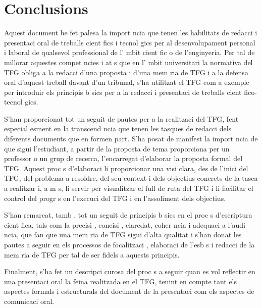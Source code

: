 
\chapter{Conclusions}

Aquest document he fet palesa la import ncia que tenen les habilitats de redacci  i presentaci  oral de treballs cient fics i tecnol gics per al desenvolupament personal i laboral de qualsevol professional de l' mbit cient fic o de l'enginyeria. Per tal de millorar aquestes compet ncies i at s que en l' mbit universitari la normativa del \ac{TFG} obliga a la redacci  d'una proposta i d'una mem ria de \ac{TFG} i a la defensa oral d'aquest treball davant d'un tribunal, s'ha utilitzat el \ac{TFG} com a exemple per introduir els principis b sics per a la redacci  i presentaci  de treballs cient fico-tecnol gics.

S'han proporcionat tot un seguit de pautes per a la realitzaci  del \ac{TFG}, fent especial esment en la transcend ncia que tenen les tasques de redacci  dels diferents documents que en formen part. S'ha posat de manifest la import ncia de que sigui l'estudiant, a partir de la proposta de tema proporciona per un professor o un grup de recerca, l'encarregat d'elaborar la proposta formal del \ac{TFG}. Aquest proc s d'elaboraci  li proporcionar  una visi  clara, des de l'inici del \ac{TFG}, del problema a resoldre, del seu context i dels objectius concrets de la tasca a realitzar i, a m s, li servir  per visualitzar el full de ruta del \ac{TFG} i li facilitar  el control del progr s en l'execuci  del \ac{TFG} i en l'assoliment dels objectius.

S'han remarcat, tamb , tot un seguit de principis b sics en el proc s d'escriptura cient fica, tals com la precisi , concisi , claredat, coher ncia i adequaci  a l'audi ncia, que fan que una mem ria de \ac{TFG} sigui d'alta qualitat i s'han donat les pautes a seguir en els processos de focalitzaci , elaboraci  de l'esb s i redacci  de la mem ria de \ac{TFG} per tal de ser fidels a aquests principis.

Finalment, s'ha fet un descripci  curosa del proc s a seguir quan es vol reflectir en una presentaci  oral la feina realitzada en el \ac{TFG}, tenint en compte tant els aspectes formals i estructurals del document de la presentaci  com els aspectes de comunicaci  oral.
